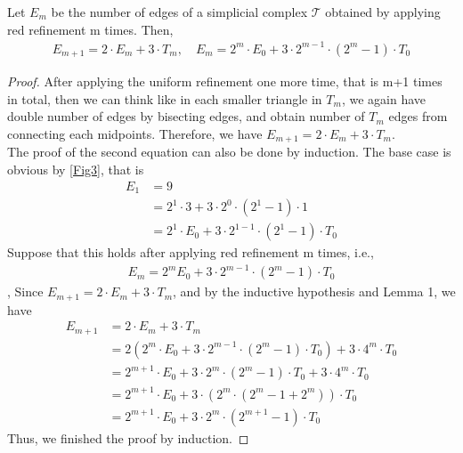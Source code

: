     \begin{lemma}
    Let $E_{m}$ be the number of edges of a simplicial complex $\mathcal{T}$ obtained by applying red refinement m times. Then,
    \begin{align*}
    E_{m+1} = 2 \cdot E_m + 3 \cdot T_m, \quad E_{m} = 2^{m}\cdot E_0 + 3 \cdot2^{m-1}\cdot(2^{m} -1)\cdot T_0
    \end{align*}
    \end{lemma}
    \begin{proof}
    After applying the uniform refinement one more time, that is m+1 times in total, then we can think like in each smaller triangle in $T_m$, we again have double number of edges by bisecting edges, and obtain number of $T_m$ edges from connecting each midpoints. Therefore, we have $E_{m+1} = 2\cdot E_m + 3\cdot T_m$.\\
    The proof of the second equation can also be done by induction. The base case is obvious by \ref{Fig3}, that is
    \begin{align*}
    E_1 &= 9 \\
    &= 2^1\cdot 3 + 3\cdot 2^0 \cdot (2^1 - 1)\cdot1\\
    &= 2^1\cdot E_0 + 3\cdot2^{1-1}\cdot(2^1 - 1)\cdot T_0
    \end{align*}
    Suppose that this holds after applying red refinement m times, i.e., 
    \begin{align*}
    E_{m} = 2^{m} E_0 + 3 \cdot2^{m-1}\cdot(2^{m} -1)\cdot T_0 
    \end{align*}, 
    Since $E_{m+1} = 2 \cdot E_m + 3 \cdot T_m$, and by the inductive hypothesis and Lemma 1, we have
    \begin{align*}
    E_{m+1} &= 2 \cdot E_m + 3 \cdot T_m \\
    &= 2(2^{m}\cdot E_0 + 3 \cdot2^{m-1}\cdot(2^{m} -1)\cdot T_0) + 3\cdot 4^m\cdot T_0\\
    &= 2^{m+1}\cdot E_0 + 3\cdot2^m\cdot(2^m - 1)\cdot T_0 + 3\cdot4^m\cdot T_0\\
    &= 2^{m+1}\cdot E_0 + 3\cdot(2^m\cdot(2^m -1 + 2^m))\cdot T_0\\
    &=2^{m+1}\cdot E_0 + 3\cdot2^m\cdot(2^{m+1}-1)\cdot T_0
    \end{align*}
    Thus, we finished the proof by induction.
    \end{proof}

